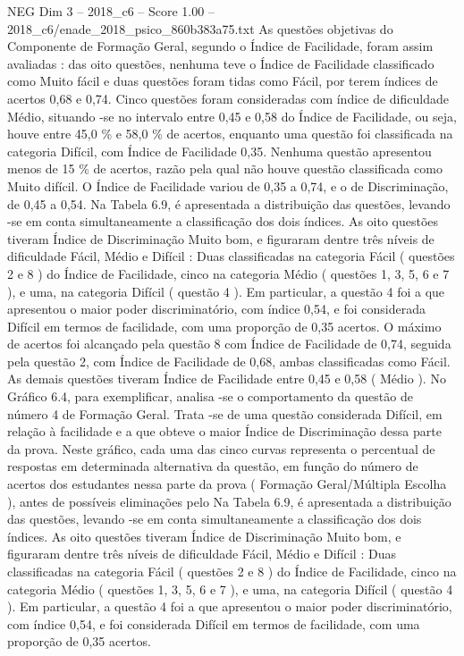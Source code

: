 \begin{textsample}{NEG Dim 3 – 2018\_c6 – Score 1.00 – 2018\_c6/enade\_2018\_psico\_860b383a75.txt}
As questões objetivas do Componente de Formação Geral, segundo o Índice de Facilidade, foram assim avaliadas : das oito questões, nenhuma teve o Índice de Facilidade classificado como Muito fácil e duas questões foram tidas como Fácil, por terem índices de acertos 0,68 e 0,74.
Cinco questões foram consideradas com índice de dificuldade Médio, situando -se no intervalo entre 0,45 e 0,58 do Índice de Facilidade, ou seja, houve entre 45,0 \% e 58,0 \% de acertos, enquanto uma questão foi classificada na categoria Difícil, com Índice de Facilidade 0,35.
Nenhuma questão apresentou menos de 15 \% de acertos, razão pela qual não houve questão classificada como Muito difícil.
O Índice de Facilidade variou de 0,35 a 0,74, e o de Discriminação, de 0,45 a 0,54.
Na Tabela 6.9, é apresentada a distribuição das questões, levando -se em conta simultaneamente a classificação dos dois índices.
As oito questões tiveram Índice de Discriminação Muito bom, e figuraram dentre três níveis de dificuldade Fácil, Médio e Difícil : Duas classificadas na categoria Fácil ( questões 2 e 8 ) do Índice de Facilidade, cinco na categoria Médio ( questões 1, 3, 5, 6 e 7 ), e uma, na categoria Difícil ( questão 4 ).
Em particular, a questão 4 foi a que apresentou o maior poder discriminatório, com índice 0,54, e foi considerada Difícil em termos de facilidade, com uma proporção de 0,35 acertos.
O máximo de acertos foi alcançado pela questão 8 com Índice de Facilidade de 0,74, seguida pela questão 2, com Índice de Facilidade de 0,68, ambas classificadas como Fácil.
As demais questões tiveram Índice de Facilidade entre 0,45 e 0,58 ( Médio ).
No Gráfico 6.4, para exemplificar, analisa -se o comportamento da questão de número 4 de Formação Geral.
Trata -se de uma questão considerada Difícil, em relação à facilidade e a que obteve o maior Índice de Discriminação dessa parte da prova.
Neste gráfico, cada uma das cinco curvas representa o percentual de respostas em determinada alternativa da questão, em função do número de acertos dos estudantes nessa parte da prova ( Formação Geral/Múltipla Escolha ), antes de possíveis eliminações pelo Na Tabela 6.9, é apresentada a distribuição das questões, levando -se em conta simultaneamente a classificação dos dois índices.
As oito questões tiveram Índice de Discriminação Muito bom, e figuraram dentre três níveis de dificuldade Fácil, Médio e Difícil : Duas classificadas na categoria Fácil ( questões 2 e 8 ) do Índice de Facilidade, cinco na categoria Médio ( questões 1, 3, 5, 6 e 7 ), e uma, na categoria Difícil ( questão 4 ).
Em particular, a questão 4 foi a que apresentou o maior poder discriminatório, com índice 0,54, e foi considerada Difícil em termos de facilidade, com uma proporção de 0,35 acertos.

\end{textsample}
